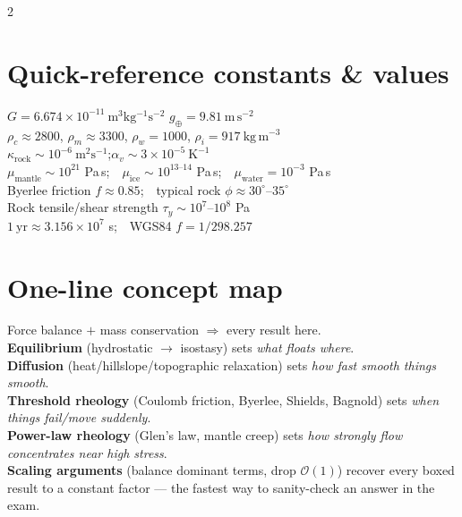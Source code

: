 \documentclass[9pt,a4paper]{extarticle}
\begin{document}
\begin{multicols}{2}
\section{Quick-reference constants \& values}
\begin{eqbox}
\footnotesize
$G=6.674\times10^{-11}\ \mathrm{m^3kg^{-1}s^{-2}}$\quad
$g_\oplus=9.81\ \mathrm{m\,s^{-2}}$\\
$\rho_c\approx2800$, $\rho_m\approx3300$, $\rho_w=1000$, $\rho_i=917\ \mathrm{kg\,m^{-3}}$\\
$\kappa_\mathrm{rock}\sim10^{-6}\ \mathrm{m^2s^{-1}}$;\quad $\alpha_v\sim3\times10^{-5}\ \mathrm{K^{-1}}$\\
$\mu_\mathrm{mantle}\sim10^{21}$ Pa\,s;\ \ $\mu_\mathrm{ice}\sim10^{13\text{--}14}$ Pa\,s;\ \ $\mu_\mathrm{water}=10^{-3}$ Pa\,s\\
Byerlee friction $f\approx0.85$;\ \ typical rock $\phi\approx30^\circ$--$35^\circ$\\
Rock tensile/shear strength $\tau_y\sim10^7$--$10^8$ Pa\\
$1\ \mathrm{yr}\approx3.156\times10^7$ s;\ \ WGS84 $f=1/298.257$
\end{eqbox}

\section{One-line concept map}
\begin{eqbox}
\footnotesize
Force balance $+$ mass conservation $\Rightarrow$ every result here.\\
\textbf{Equilibrium} (hydrostatic $\to$ isostasy) sets \emph{what floats where}.\\
\textbf{Diffusion} (heat/hillslope/topographic relaxation) sets \emph{how fast smooth things smooth}.\\
\textbf{Threshold rheology} (Coulomb friction, Byerlee, Shields, Bagnold) sets \emph{when things fail/move suddenly}.\\
\textbf{Power-law rheology} (Glen's law, mantle creep) sets \emph{how strongly flow concentrates near high stress}.\\
\textbf{Scaling arguments} (balance dominant terms, drop $\mathcal O(1)$) recover every boxed result to a constant factor --- the fastest way to sanity-check an answer in the exam.
\end{eqbox}

\end{multicols}
\end{document}

